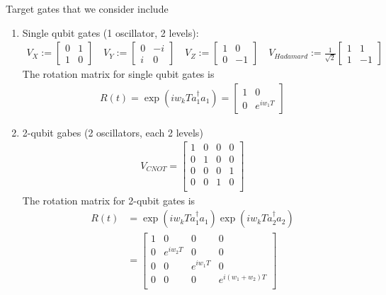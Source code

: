\documentclass[letterpaper]{article}
\begin{document}
Target gates that we consider include
\begin{enumerate}
  \item Single qubit gates (1 oscillator, 2 levels):
    \begin{align}
      V_{X} := \begin{bmatrix} 0 & 1 \\ 1 & 0  \end{bmatrix} \quad
      V_{Y} := \begin{bmatrix} 0 & -i \\ i & 0 \end{bmatrix} \quad
      V_{Z} := \begin{bmatrix} 1 & 0 \\ 0 & -1 \end{bmatrix} \quad 
      V_{Hadamard} := \frac{1}{\sqrt{2}} \begin{bmatrix} 1 & 1 \\ 1 & -1 \end{bmatrix}
    \end{align}
    The rotation matrix for single qubit gates is 
    \begin{align}
    R(t) = \exp(iw_kTa_1^{\dagger}a_1) = \begin{bmatrix} 1 & 0 \\ 0 & e^{iw_1T} \end{bmatrix}
    \end{align}
  \item 2-qubit gabes (2 oscillators, each 2 levels)
    \begin{align}
        V_{CNOT} = \begin{bmatrix} 1  & 0 & 0 & 0 \\ 
                                   0  & 1 & 0 & 0 \\ 
                                   0  & 0 & 0 & 1 \\ 
                                   0  & 0 & 1 & 0 \\ 
                    \end{bmatrix}
    \end{align} 
    The rotation matrix for 2-qubit gates is 
    \begin{align}
    R(t) &= \exp(iw_kTa_1^{\dagger}a_1)\exp(iw_kTa_2^{\dagger}a_2) \\
       &= \begin{bmatrix} 1 & 0 & 0 & 0\\
                          0 & e^{iw_2T} & 0 & 0 \\
                          0 & 0 & e^{iw_1T} & 0 \\
                          0 & 0 & 0 & e^{i(w_1+w_2)T}  \\
            \end{bmatrix}
    \end{align}

\end{enumerate}
\end{document}
